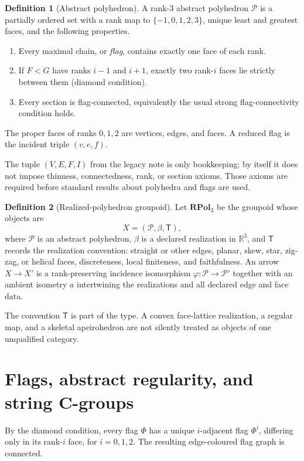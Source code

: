 \documentclass[11pt,a4paper]{article}
\theoremstyle{definition}
\newtheorem{definition}{Definition}[section]
\theoremstyle{plain}
\theoremstyle{remark}
\newcommand{\R}{\mathbb{R}}
\newcommand{\Pcal}{\mathcal P}
\begin{document}
\begin{definition}[Abstract polyhedron]
A rank-\(3\) abstract polyhedron \(\Pcal\) is a partially ordered set
with a rank map to \(\{-1,0,1,2,3\}\), unique least and greatest
faces, and the following properties.
\begin{enumerate}[label=(\roman*),leftmargin=1.6em]
  \item Every maximal chain, or \emph{flag}, contains exactly one face
  of each rank.
  \item If \(F<G\) have ranks \(i-1\) and \(i+1\), exactly two
  rank-\(i\) faces lie strictly between them (diamond condition).
  \item Every section is flag-connected, equivalently the usual
  strong flag-connectivity condition holds.
\end{enumerate}
The proper faces of ranks \(0,1,2\) are vertices, edges, and faces.
A reduced flag is the incident triple \((v,e,f)\).
\end{definition}

The tuple \((V,E,F,I)\) from the legacy note is only bookkeeping; by
itself it does not impose thinness, connectedness, rank, or section
axioms.  Those axioms are required before standard results about
polyhedra and flags are used.

\begin{definition}[Realized-polyhedron groupoid]
Let \(\mathbf{RPol}_3\) be the groupoid whose objects are
\[
X=(\Pcal,\beta,\mathsf T),
\]
where \(\Pcal\) is an abstract polyhedron, \(\beta\) is a declared
realization in \(\R^3\), and \(\mathsf T\) records the realization
convention: straight or other edges, planar, skew, star, zig-zag, or
helical faces, discreteness, local finiteness, and faithfulness.
An arrow \(X\to X'\) is a rank-preserving incidence isomorphism
\(\varphi:\Pcal\to\Pcal'\) together with an ambient isometry \(a\)
intertwining the realizations and all declared edge and face data.
\end{definition}

The convention \(\mathsf T\) is part of the type.  A convex
face-lattice realization, a regular map, and a skeletal apeirohedron
are not silently treated as objects of one unqualified category.

\section{Flags, abstract regularity, and string C-groups}

By the diamond condition, every flag \(\Phi\) has a unique
\(i\)-adjacent flag \(\Phi^i\), differing only in its rank-\(i\)
face, for \(i=0,1,2\).  The resulting edge-coloured flag graph is
connected.
\end{document}

